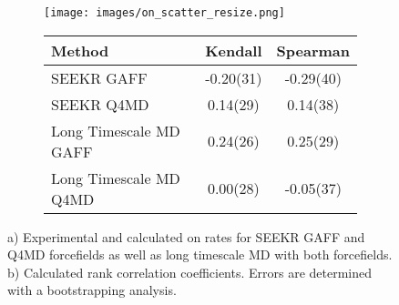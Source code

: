 \begin{figure}
	\begin{subfigure}{\linewidth}
	\texttt{[image: images/on\_scatter\_resize.png]}
	\caption{}
	\end{subfigure}

	\bigskip
	

	\begin{subfigure}{\linewidth}%
    \begin{tabular}{
l  S[table-format = 2.3(3), separate-uncertainty] 
  S[table-format = 2.3(3), separate-uncertainty] 
 }%

\textbf{Method} & \textbf{Kendall} & \textbf{Spearman}  \\
\hline
      SEEKR GAFF      &    -0.20(31)           &    -0.29(40)            \\ 
      SEEKR Q4MD      &    0.14(29)           &    0.14(38)             \\ 
      Long Timescale MD GAFF      &    0.24(26)           &    0.25(29)                     \\ 
      Long Timescale MD Q4MD      &    0.00(28)           &    -0.05(37)                     \\ 
     

    \end{tabular}
        \caption{}
	\end{subfigure}
	\caption{a) Experimental and calculated on rates for SEEKR GAFF and Q4MD forcefields as well as long timescale MD with both forcefields. b) Calculated rank correlation coefficients. Errors are determined with a bootstrapping analysis. }
  \label{fig:on_scatter}
  \end{figure}